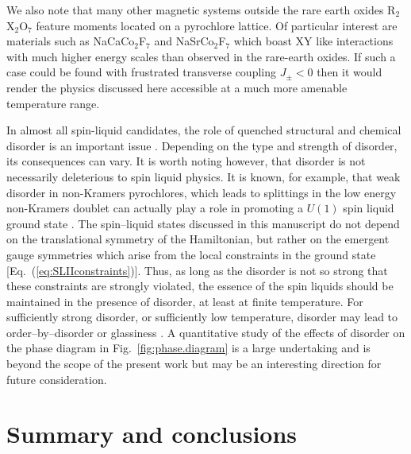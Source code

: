 \documentclass[apsrev4-1,prx,superscriptaddress,floatfix,twocolumn,longbibliography]{revtex4-1}
\begin{document}
We also note that many other magnetic systems outside the rare earth oxides R$_2$X$_2$O$_7$
feature moments located on a pyrochlore lattice.
%
Of particular interest are materials such as NaCaCo$_2$F$_7$ and NaSrCo$_2$F$_7$
\cite{ross16, ross17} which boast XY like interactions with much higher energy 
scales than observed in the rare-earth oxides.
%
If such a case could be found with frustrated transverse coupling $J_{\pm}<0$ 
then it would render the physics discussed here accessible at a
much more amenable temperature range.


In almost all  spin-liquid candidates, the role
of quenched structural and chemical disorder is an important issue
\cite{ross12,Wen2017,benton-arXiv17,mostaed17,taniguchi13,kermarrec14,han16,norman16,li17-PRL118,martin-arXiv17}.
%
Depending on the type and strength of disorder, its consequences can vary.
%
It is worth noting however, that disorder is not necessarily deleterious to
spin liquid physics.
%
It is known, for example, that weak disorder in non-Kramers pyrochlores,
which leads to splittings in the low energy non-Kramers doublet can
actually play a role in promoting a $U(1)$ spin liquid ground state \cite{savary17-PRL118}.
%
The spin--liquid states discussed in this manuscript do not
depend on the translational symmetry of the Hamiltonian, but rather 
on the emergent gauge symmetries which arise from the local constraints
in the ground state [Eq.~(\ref{eq:SLIIconstraints})].
%
Thus, as long as the disorder is not so strong that these constraints
are strongly violated, the essence of the spin liquids should be maintained 
in the presence of disorder, at least at finite temperature.
%
For sufficiently strong disorder, or sufficiently low temperature,
disorder may lead to order--by--disorder or glassiness \cite{bellier01, saunders07}.
%
A quantitative study of the effects of disorder on the phase diagram
in Fig.~\ref{fig:phase.diagram} is a large undertaking and is beyond the
scope of the present work but may be an interesting direction for future
consideration.

\section{Summary and conclusions}
\label{sec:conclusion}

\end{document}
